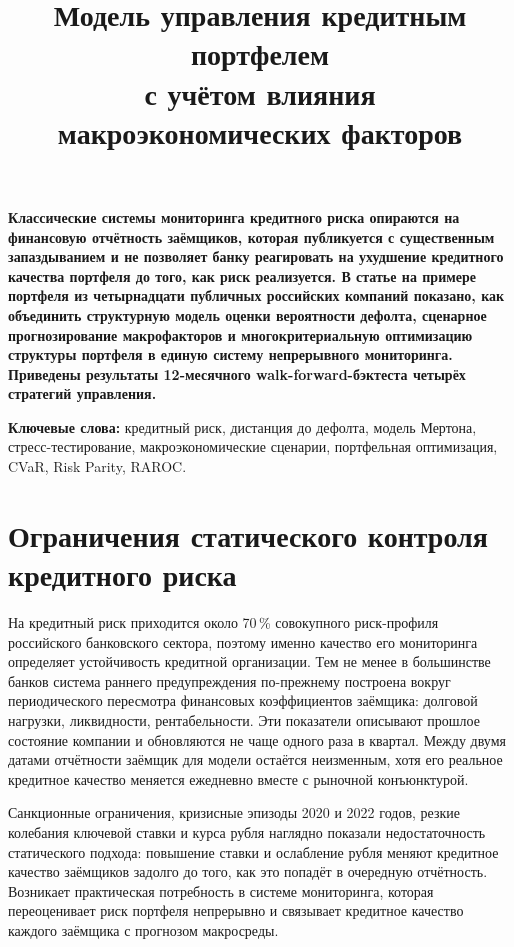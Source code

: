 \documentclass[a4paper,12pt]{article}
\title{\vspace{-1.5cm}\textbf{Модель управления кредитным портфелем\\
    с учётом влияния макроэкономических факторов}}
\author{}
\date{}
\begin{document}
\maketitle
\thispagestyle{empty}

\textbf{Классические системы мониторинга кредитного риска опираются на финансовую отчётность
заёмщиков, которая публикуется с существенным запаздыванием и не позволяет банку реагировать
на ухудшение кредитного качества портфеля до того, как риск реализуется. В статье на примере
портфеля из четырнадцати публичных российских компаний показано, как объединить структурную
модель оценки вероятности дефолта, сценарное прогнозирование макрофакторов и многокритериальную
оптимизацию структуры портфеля в единую систему непрерывного мониторинга. Приведены результаты
12-месячного walk-forward-бэктеста четырёх стратегий управления.}

\bigskip

\textbf{Ключевые слова:} кредитный риск, дистанция до дефолта, модель Мертона, стресс-тестирование,
макроэкономические сценарии, портфельная оптимизация, CVaR, Risk Parity, RAROC.

\bigskip

\section{Ограничения статического контроля кредитного риска}

На кредитный риск приходится около 70\,\% совокупного риск-профиля российского банковского
сектора, поэтому именно качество его мониторинга определяет устойчивость кредитной организации.
Тем не менее в большинстве банков система раннего предупреждения по-прежнему построена вокруг
периодического пересмотра финансовых коэффициентов заёмщика: долговой нагрузки, ликвидности,
рентабельности. Эти показатели описывают прошлое состояние компании и обновляются не чаще
одного раза в квартал. Между двумя датами отчётности заёмщик для модели остаётся неизменным,
хотя его реальное кредитное качество меняется ежедневно вместе с рыночной конъюнктурой.

Санкционные ограничения, кризисные эпизоды 2020 и 2022 годов, резкие колебания ключевой ставки
и курса рубля наглядно показали недостаточность статического подхода: повышение ставки и
ослабление рубля меняют кредитное качество заёмщиков задолго до того, как это попадёт
в очередную отчётность. Возникает практическая потребность в системе мониторинга, которая
переоценивает риск портфеля непрерывно и связывает кредитное качество каждого заёмщика
с прогнозом макросреды.
\end{document}
